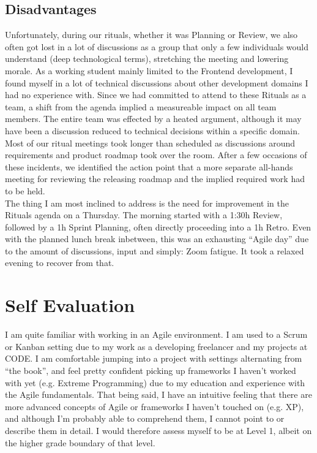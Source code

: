 \documentclass[a4paper]{article}
\begin{document}
\subsection{Disadvantages}
Unfortunately, during our rituals, whether it was Planning or Review, we also often got lost in a lot of discussions as a group that only a few individuals would understand (deep technological terms), stretching the meeting and lowering morale. 
As a working student mainly limited to the Frontend development, I found myself in a lot of technical discussions about other development domains I had no experience with. 
Since we had committed to attend to these Rituals as a team, a shift from the agenda implied a measureable impact on all team members. The entire team was effected by a heated argument, although it may have been a discussion reduced to technical decisions within a specific domain.
Most of our ritual meetings took longer than scheduled as discussions around requirements and product roadmap took over the room. 
After a few occasions of these incidents, we identified the action point that a more separate all-hands meeting for reviewing the releasing roadmap and the implied required work had to be held. 
\\\linebreak
The thing I am most inclined to address is the need for improvement in the Rituals agenda on a Thursday. 
The morning started with a 1:30h Review, followed by a 1h Sprint Planning, often directly proceeding into a 1h Retro. 
Even with the planned lunch break inbetween, this was an exhausting “Agile day” due to the amount of discussions, input and simply: Zoom fatigue. 
It took a relaxed evening to recover from that.
\section{Self Evaluation}
I am quite familiar with working in an Agile environment. 
I am used to a Scrum or Kanban setting due to my work as a developing freelancer and my projects at CODE. 
I am comfortable jumping into a project with settings alternating from “the book”, and feel pretty confident picking up frameworks I haven’t worked with yet (e.g. Extreme Programming) due to my education and experience with the Agile fundamentals. 
That being said, I have an intuitive feeling that there are more advanced concepts of Agile or frameworks I haven’t touched on (e.g. XP), and although I'm probably able to comprehend them, I cannot point to or describe them in detail. 
I would therefore assess myself to be at Level 1, albeit on the higher grade boundary of that level. 
\end{document}
